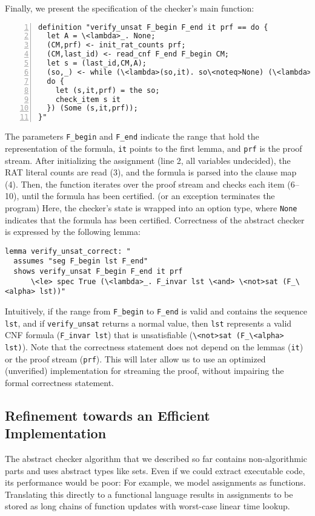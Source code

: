 \documentclass{llncs}
\newcommand{\isai}{\lstinline[language=isabelle,basicstyle=\normalsize\ttfamily\slshape]}
\begin{document}
Finally, we present the specification of the checker's main function:
\begin{lstlisting}[numbers=left, xleftmargin=2em]
definition "verify_unsat F_begin F_end it prf == do {
  let A = \<lambda>_. None;
  (CM,prf) <- init_rat_counts prf;
  (CM,last_id) <- read_cnf F_end F_begin CM;
  let s = (last_id,CM,A);
  (so,_) <- while (\<lambda>(so,it). so\<noteq>None) (\<lambda>(so,it). 
  do {
    let (s,it,prf) = the so;
    check_item s it
  }) (Some (s,it,prf));
}"
\end{lstlisting}
The parameters \isai{F_begin} and \isai{F_end} indicate the range that hold the representation of the formula, \isai{it} points to the 
first lemma, and \isai{prf} is the proof stream.
After initializing the assignment (line 2, all variables undecided), the RAT literal counts are read (3), and the formula is parsed into the clause map (4).
Then, the function iterates over the proof stream and checks each item (6--10), until the formula has been certified. (or an exception terminates the program)
Here, the checker's state is wrapped into an option type, where \isai{None} indicates that the formula has been certified. 
%
Correctness of the abstract checker is expressed by the following lemma:
\begin{lstlisting}
lemma verify_unsat_correct: "
  assumes "seg F_begin lst F_end"
  shows verify_unsat F_begin F_end it prf
      \<le> spec True (\<lambda>_. F_invar lst \<and> \<not>sat (F_\<alpha> lst))"
\end{lstlisting}
Intuitively, if the range from \isai{F_begin} to \isai{F_end} is valid and contains the sequence \isai{lst},
and if \isai{verify_unsat} returns a normal value, then \isai{lst} represents a valid CNF formula (\isai{F_invar lst}) 
that is unsatisfiable (\isai{\<not>sat (F_\<alpha> lst)}). Note that the correctness statement does not depend on the 
lemmas (\isai{it}) or the proof stream (\isai{prf}). This will later allow us to use an optimized (unverified) 
implementation for streaming the proof, without impairing the formal correctness statement.

\subsection{Refinement towards an Efficient Implementation}    
The abstract checker algorithm that we described so far contains non-algorithmic parts and uses abstract types like sets.
Even if we could extract executable code, its performance would be poor: For example, we model assignments as functions. Translating 
this directly to a functional language results in assignments to be stored as long chains of function updates with worst-case linear time lookup.
\end{document}

